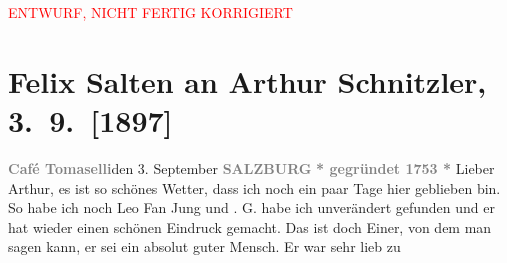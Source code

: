 
\begin{center}
            \textcolor{red}{ENTWURF, NICHT FERTIG KORRIGIERT}
                      \end{center}
            
         
         \renewcommand{\erwaehntePersonen}{Personen: Paul Goldmann, Leo Van-Jung}
         \renewcommand{\erwaehnteOrte}{Orte: Café Tomaselli, Hotel Erzherzog Karl, Salzburg, Wien}
         \renewcommand{\erwaehnteWerke}{}
               \section[Felix Salten an Arthur Schnitzler, 3. 9. {[}1897{]}]{ Felix Salten an Arthur Schnitzler, 3. 9. {[}1897{]}}\nopagebreak{}\rehead{ }\begin{ledgroupsized}[t]{13cm}\normalsize\beginnumbering \toendnotes[C]{\smallbreak\pagebreak[2]} 
\toendnotes[C]{\smallbreak}\pstart
           \noindent{}{\pb}\textcolor{gray}{\textbf{Café Tomaselli}}\hfill den 3. September\pend
           \pstart
           \textcolor{gray}{\textbf{SALZBURG}}\pend
           \pstart
           \textcolor{gray}{\textbf{* gegründet 1753 *}}\pend
           \pstart
           Lieber Arthur, es ist so schönes Wetter, dass ich noch ein paar Tage
               hier geblieben bin. So habe ich noch Leo Fan Jung und \label{K_L03274-1v}\label{K_L03274-1h}. G. habe ich
               unverändert gefunden und er hat wieder einen schönen Eindruck gemacht. Das ist doch
               Einer, von dem man sagen kann, er sei ein absolut guter Mensch. Er war sehr lieb zu

\end{ledgroupsized}
